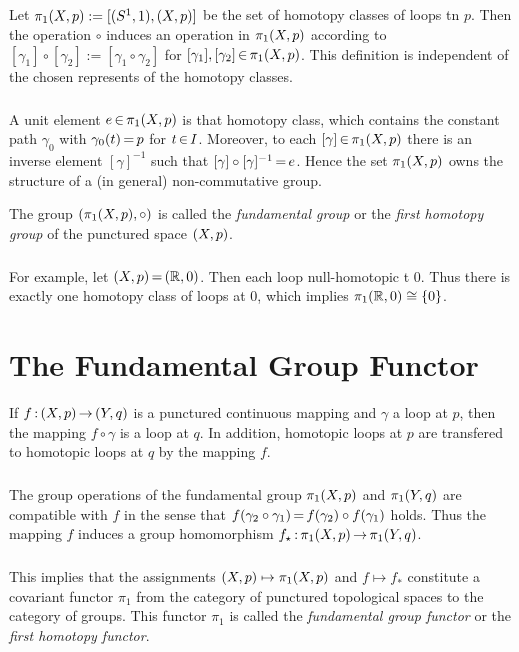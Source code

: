 \documentclass[11pt,twoside]{article}
\begin{document}
\subparagraph{}
Let $\pi_1(X,p) := [(S^1,1),(X,p)]$ be the set of homotopy classes
of loops tn $p$.
Then the operation $\circ$ induces an operation
in $\pi_1(X,p)$ according to
$[\gamma_1] \circ [\gamma_2] := [\gamma_1 \circ \gamma_2]$
for $[\gamma_1], [\gamma_2] {\,\in\,} \pi_1(X,p)$.
This definition is independent of the chosen represents of the homotopy classes.

\subparagraph{}
A unit element $e {\,\in\,} \pi_1(X,p)$ is that homotopy class,
which contains the constant path $\gamma_0$
with $\gamma_0(t) {\,=\,} p$ for $t {\,\in\,} I$.
Moreover,
to each $[\gamma] {\,\in\,} \pi_1(X,p)$
there is an inverse element $[\gamma]^{-1}$
such that
$[\gamma] \circ [\gamma]^{-1} {\,=\,} e$.
Hence the set $\pi_1(X,p)$ owns the structure of a (in general)
non-commutative group.

\begin{definition} %
The group $(\pi_1(X,p),\circ)$ is called the \textit{fundamental group}
or the \textit{first homotopy group} of the punctured space $(X,p)$.
\end{definition}

\subparagraph{}
For example,
let $(X,p) {\,=\,} ({\mathbb{R}},0)$.
Then each loop null-homotopic t $0$.
Thus there is exactly one homotopy class of loops at $0$,
which implies $\pi_1({\mathbb{R}},0) \cong \{0\}$.

\section{The Fundamental Group Functor}
If $f {\,:\,} (X,p) {\,\to\,} (Y,q)$ is a punctured continuous mapping and
$\gamma$ a loop at $p$,
then the mapping $f \circ \gamma$ is a loop at $q$.
In addition,
homotopic loops at $p$ are transfered to homotopic loops at $q$
by the mapping $f$.

\subparagraph{}
The group operations of the fundamental group $\pi_1(X,p)$
and $\pi_1(Y,q)$ are compatible with $f$ in the sense
that $f(\gamma_2 \circ \gamma_1) {\,=\,} f(\gamma_2) \circ f(\gamma_1)$ holds.
Thus the mapping $f$ induces a group homomorphism
$f_{\star} {\,:\,} \pi_1(X,p) {\,\to\,} \pi_1(Y,q)$.

\subparagraph{}
This implies
that the assignments $(X,p) \mapsto \pi_1(X,p)$ and $f \mapsto f_{*}$
constitute a covariant functor $\pi_1$ from the category of
punctured topological spaces to the category of groups.
This functor $\pi_1$ is called the \textit{fundamental group functor}
or the \textit{first homotopy functor}.
\end{document}
